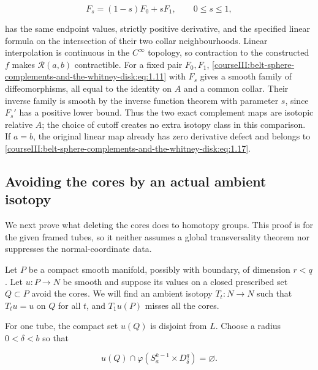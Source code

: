 \begin{equation}
F_s=(1-s)F_0+sF_1,\qquad0\leq s\leq1,
\label{courseIII:belt-sphere-complements-and-the-whitney-disk:eq:1.18}
\end{equation}

has the same endpoint values, strictly positive derivative, and the specified linear formula on the intersection of their two collar neighbourhoods. Linear interpolation is continuous in the \(C^\infty\) topology, so contraction to the constructed \(f\) makes \(\mathcal R(a,b)\) contractible. For a fixed pair \(F_0,F_1\), \eqref{courseIII:belt-sphere-complements-and-the-whitney-disk:eq:1.11} with \(F_s\) gives a smooth family of diffeomorphisms, all equal to the identity on \(A\) and a common collar. Their inverse family is smooth by the inverse function theorem with parameter \(s\), since \(F_s'\) has a positive lower bound. Thus the two exact complement maps are isotopic relative \(A\); the choice of cutoff creates no extra isotopy class in this comparison. If \(a=b\), the original linear map already has zero derivative defect and belongs to \eqref{courseIII:belt-sphere-complements-and-the-whitney-disk:eq:1.17}.

\subsection{Avoiding the cores by an actual ambient isotopy}
\label{courseIII:belt-sphere-complements-and-the-whitney-disk:core-avoidance}

\label{courseIII:belt-sphere-complements-and-the-whitney-disk:section-2}\label{courseIII:belt-complement:2}

We next prove what deleting the cores does to homotopy groups. This proof is for the given framed tubes, so it neither assumes a global transversality theorem nor suppresses the normal-coordinate data.

Let \(P\) be a compact smooth manifold, possibly with boundary, of dimension \(r<q\). Let \(u:P\to N\) be smooth and suppose its values on a closed prescribed set \(Q\subset P\) avoid the cores. We will find an ambient isotopy \(T_t:N\to N\) such that \(T_tu=u\) on \(Q\) for all \(t\), and \(T_1u(P)\) misses all the cores.

For one tube, the compact set \(u(Q)\) is disjoint from \(L\). Choose a radius \(0<\delta<b\) so that

\begin{equation}
u(Q)\cap\varphi(S_a^{k-1}\times D_\delta^q)=\varnothing.
\label{courseIII:belt-sphere-complements-and-the-whitney-disk:eq:2.1}
\end{equation}

